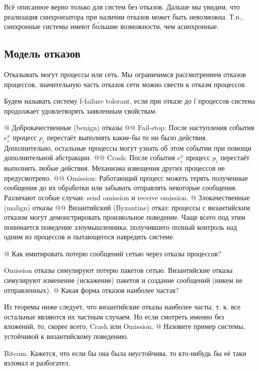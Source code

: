 \begin{note}
Всё описанное верно только для систем без отказов. Дальше мы увидим, что реализация синхронзатора при наличии отказов может быть невозможна. Т.о., синхронные системы имеют б\'{о}льшие возможности, чем асинхронные.
\end{note}

\subsection{Модель отказов}
Отказывать могут процессы или сеть. Мы ограничимся рассмотрением отказов процессов, значительную часть отказов сети можно свести к отказм процессов.

Будем называть систему f-failure tolerant, если при отказе до f процессов система продолжает удовлетворять заявленным свойствам.

\begin{el}[ul]
@ Доброкачественные (benign) отказы
@@ Fail-stop: После наступления события $e_i^x$ процесс $p_i$ перестаёт выполнять какие-бы то ни было действия. Дополнительно, остальные процессы могут узнать об этом событии при помощи дополнительной абстракции.
@@ Crash: После события $e_i^x$ процесс $p_i$ перестаёт выполнять любые действия. Механизма извещения других процессов не предусмотрено.
@@ Omission: Работающий процесс можеть терять полученные сообщения до их обработки или забывать отправлять некоторые сообщения. Различают особые случаи: send omission и receive omission.
@ Злокачественные (malign) отказы
@@ Византийский (Byzantine) отказ: процессы с византийским отказом могут демонстрировать произвольное поведение. Чаще всего под этим понимается поведение злоумышленника, получившего полный контроль над одним из процессов и пытающегося навредить системе.
\end{el}

\begin{el}[ul]
@ Как имитировать потерю сообщений сетью через отказы процессов?

Omission отказы симулируют потерю пакетов сетью. Византийские отказы симулируют изменение (искажение) пакетов и создание сообщений (никем не отправленных).
@ Какая форма отказов наиболее частая?

Из теоремы ниже следует, что византийские отказы наиболее часты, т. к. все остальные являются их частным случаем. Но если смотреть именно без вложений, то, скорее всего, Crash или Omission.
@ Назовите пример системы, устойчивой к византийскому поведению.

Bitcoin. Кажется, что если бы она была неустойчива, то кто-нибудь бы её таки взломал и разбогател.
\end{el}

